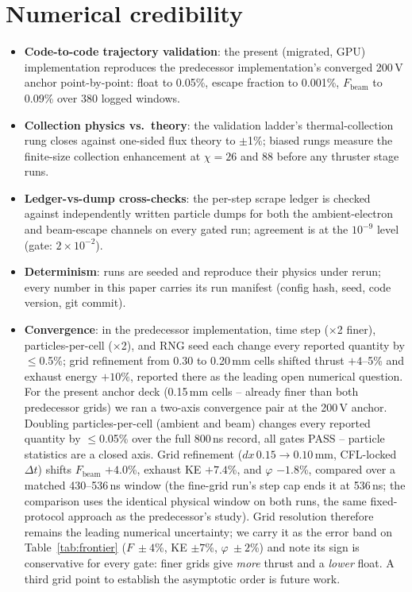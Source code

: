 \documentclass[11pt]{article}
\begin{document}
\section{Numerical credibility}
\label{sec:credibility}
\begin{itemize}
  \item \textbf{Code-to-code trajectory validation}: the present (migrated,
        GPU) implementation reproduces the predecessor implementation's
        converged 200\,V anchor point-by-point: float to 0.05\%, escape
        fraction to 0.001\%, $F_{\mathrm{beam}}$ to 0.09\% over 380 logged
        windows.
  \item \textbf{Collection physics vs.\ theory}: the validation ladder's
        thermal-collection rung closes against one-sided flux theory to
        $\pm$1\%; biased rungs measure the finite-size collection
        enhancement at $\chi = 26$ and 88 before any thruster stage runs.
  \item \textbf{Ledger-vs-dump cross-checks}: the per-step scrape ledger is
        checked against independently written particle dumps for both the
        ambient-electron and beam-escape channels on every gated run;
        agreement is at the $10^{-9}$ level (gate: $2\times10^{-2}$).
  \item \textbf{Determinism}: runs are seeded and reproduce their physics
        under rerun; every number in this paper carries its run manifest
        (config hash, seed, code version, git commit).
  \item \textbf{Convergence}: in the predecessor implementation, time step
        ($\times$2 finer), particles-per-cell ($\times$2), and RNG seed each
        change every reported quantity by $\le$0.5\%; grid refinement from
        0.30 to 0.20\,mm cells shifted thrust $+4$--5\% and exhaust energy
        $+10\%$, reported there as the leading open numerical question. For
        the present anchor deck (0.15\,mm cells -- already finer than
        both predecessor grids) we ran a two-axis convergence pair at the
        200\,V anchor. Doubling particles-per-cell (ambient and beam)
        changes every reported quantity by $\le$0.05\% over the full
        800\,ns record, all gates PASS -- particle statistics are a closed
        axis. Grid refinement ($dx\,0.15\!\to\!0.10$\,mm, CFL-locked
        $\Delta t$) shifts $F_{\mathrm{beam}}$ $+4.0$\%, exhaust KE
        $+7.4$\%, and $\varphi$ $-1.8$\%, compared over a matched
        430--536\,ns window (the fine-grid run's step cap ends it at
        536\,ns; the comparison uses the identical physical window on both
        runs, the same fixed-protocol approach as the predecessor's study).
        Grid resolution therefore remains the leading numerical
        uncertainty; we carry it as the error band on
        Table~\ref{tab:frontier} ($F\ {\pm}4$\%, KE ${\pm}7$\%,
        $\varphi\ {\pm}2$\%) and note its sign is conservative for every
        gate: finer grids give \emph{more} thrust and a \emph{lower}
        float. A third grid point to establish the asymptotic order is
        future work.
\end{itemize}
\end{document}
